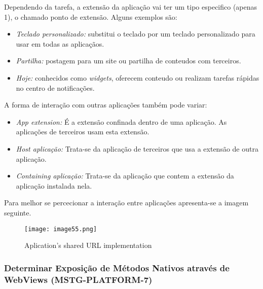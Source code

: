 Dependendo da tarefa, a extensão da aplicação vai ter um tipo especifico (apenas 1), o chamado ponto de extensão. Alguns exemplos são:
\begin{itemize}
\item \textit{Teclado personalizado:} substitui o teclado por um teclado personalizado para usar em todas as aplicaçãos.\par
\hfill\par

\item \textit{Partilha:} postagem para um site ou partilha de conteudos com terceiros.\par
\hfill\par

\item \textit{Hoje:} conhecidos como \textit{widgets}, oferecem conteudo ou realizam tarefas rápidas no centro de notificações.
\end{itemize}
A forma de interação com outras aplicações também pode variar:
\begin{itemize}
\item \textit{App extension:} É a extensão confinada dentro de uma aplicação. As aplicações de terceiros usam esta extensão.\par
\hfill\par

\item \textit{Host aplicação:} Trata-se da aplicação de terceiros que usa a extensão de outra aplicação.\par
\hfill\par

\item \textit{Containing aplicação:} Trata-se da aplicação que contem a extensão da aplicação instalada nela. \par
\hfill\par
\end{itemize}
Para melhor se percecionar a interação entre aplicações apresenta-se a imagem seguinte.

\begin{figure}[H]
\centering
\texttt{[image: image55.png]}
\caption {Aplication's shared URL implementation}
\label {fig02}
\end{figure}



\subsubsection{Determinar Exposição de Métodos Nativos através de WebViews (MSTG-PLATFORM-7)}
\hfill\par
\hfill\par

